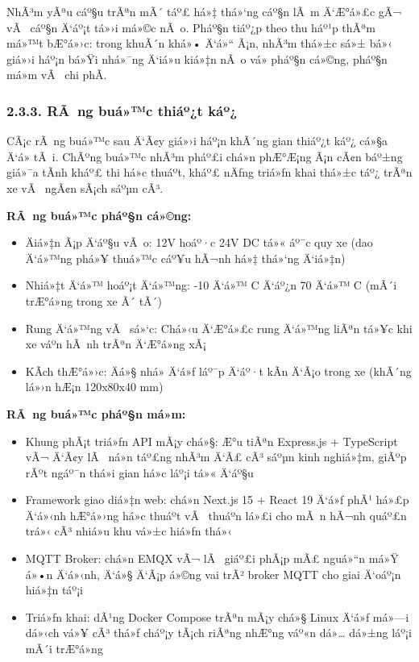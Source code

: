 \documentclass[a4paper]{extarticle}
\providecommand{\tightlist}{%
  \setlength{\itemsep}{0pt}\setlength{\parskip}{0pt}}
\begin{document}
NhÃ³m yÃªu cáº§u trÃªn mÃ´ táº£ há»‡ thá»‘ng cáº§n lÃ m Ä‘Æ°á»£c gÃ¬ vÃ  cáº§n Ä‘áº¡t tá»›i má»©c nÃ o.
Pháº§n tiáº¿p theo thu háº¹p thÃªm má»™t bÆ°á»›c: trong khuÃ´n khá»• Ä‘á»“ Ã¡n, nhÃ³m thá»±c
sá»± bá»‹ giá»›i háº¡n bá»Ÿi nhá»¯ng Ä‘iá»u kiá»‡n nÃ o vá» pháº§n cá»©ng, pháº§n má»m vÃ  chi
phÃ­.

\subsubsection{2.3.3. RÃ ng buá»™c thiáº¿t
káº¿}\label{233-ruxe0ng-buux1ed9c-thiux1ebft-kux1ebf}

CÃ¡c rÃ ng buá»™c sau Ä‘Ã¢y giá»›i háº¡n khÃ´ng gian thiáº¿t káº¿ cá»§a Ä‘á» tÃ i. ChÃºng buá»™c
nhÃ³m pháº£i chá»n phÆ°Æ¡ng Ã¡n cÃ¢n báº±ng giá»¯a tÃ­nh kháº£ thi há»c thuáº­t, kháº£ nÄƒng
triá»ƒn khai thá»±c táº¿ trÃªn xe vÃ  ngÃ¢n sÃ¡ch sáºµn cÃ³.

\textbf{RÃ ng buá»™c pháº§n cá»©ng:}

\begin{itemize}
\tightlist
\item
  Äiá»‡n Ã¡p Ä‘áº§u vÃ o: 12V hoáº·c 24V DC tá»« áº¯c quy xe (dao Ä‘á»™ng phá»¥ thuá»™c cáº¥u
  hÃ¬nh há»‡ thá»‘ng Ä‘iá»‡n)
\item
  Nhiá»‡t Ä‘á»™ hoáº¡t Ä‘á»™ng: -10 Ä‘á»™ C Ä‘áº¿n 70 Ä‘á»™ C (mÃ´i trÆ°á»ng trong xe Ã´ tÃ´)
\item
  Rung Ä‘á»™ng vÃ  sá»‘c: Chá»‹u Ä‘Æ°á»£c rung Ä‘á»™ng liÃªn tá»¥c khi xe váº­n hÃ nh trÃªn
  Ä‘Æ°á»ng xÃ¡
\item
  KÃ­ch thÆ°á»›c: Äá»§ nhá» Ä‘á»ƒ láº¯p Ä‘áº·t kÃ­n Ä‘Ã¡o trong xe (khÃ´ng lá»›n hÆ¡n
  120x80x40 mm)
\end{itemize}

\textbf{RÃ ng buá»™c pháº§n má»m:}

\begin{itemize}
\tightlist
\item
  Khung phÃ¡t triá»ƒn API mÃ¡y chá»§: Æ°u tiÃªn Express.js + TypeScript vÃ¬ Ä‘Ã¢y lÃ  ná»n táº£ng
  nhÃ³m Ä‘Ã£ cÃ³ sáºµn kinh nghiá»‡m, giÃºp rÃºt ngáº¯n thá»i gian há»c láº¡i tá»« Ä‘áº§u
\item
  Framework giao diá»‡n web: chá»n Next.js 15 + React 19 Ä‘á»ƒ phÃ¹ há»£p Ä‘á»‹nh hÆ°á»›ng
  há»c thuáº­t vÃ  thuáº­n lá»£i cho mÃ n hÃ¬nh quáº£n trá»‹ cÃ³ nhiá»u khu vá»±c hiá»ƒn thá»‹
\item
  MQTT Broker: chá»n EMQX vÃ¬ lÃ  giáº£i phÃ¡p mÃ£ nguá»“n má»Ÿ á»•n Ä‘á»‹nh, Ä‘á»§ Ä‘Ã¡p á»©ng
  vai trÃ² broker MQTT cho giai Ä‘oáº¡n hiá»‡n táº¡i
\item
  Triá»ƒn khai: dÃ¹ng Docker Compose trÃªn mÃ¡y chá»§ Linux Ä‘á»ƒ má»—i dá»‹ch vá»¥ cÃ³
  thá»ƒ cháº¡y tÃ¡ch riÃªng nhÆ°ng váº«n dá»… dá»±ng láº¡i mÃ´i trÆ°á»ng
\end{itemize}
\end{document}

